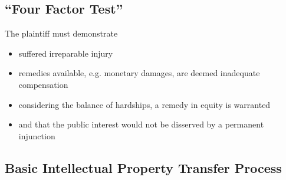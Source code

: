 \documentclass[10pt,a4paper,twocolumn]{article}
\begin{document}

\subsection{``Four Factor Test''} %
\label{sub:_four_factor_test_}

The plaintiff must demonstrate
\begin{itemize}
  \item suffered irreparable injury
  \item remedies available, e.g. monetary damages, are deemed inadequate compensation
  \item considering the balance of hardships, a remedy in equity is warranted
  \item and that the public interest would not be disserved by a permanent injunction
\end{itemize}


\subsection{Basic Intellectual Property Transfer Process} %
\label{sub:basic_intellectual_property_transfer_process}
\end{document}
